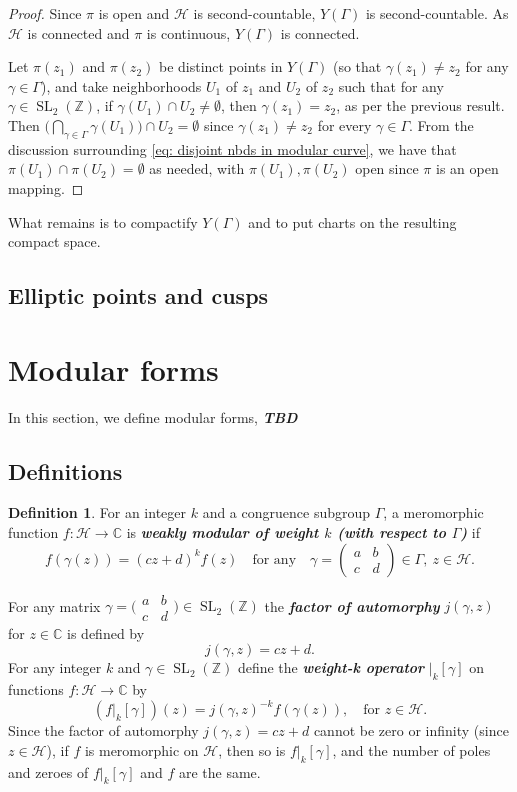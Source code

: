 \documentclass[10pt,leqno]{article}
\theoremstyle{plain}
\theoremstyle{definition}
\newtheorem{definition}[lem]{Definition}
\numberwithin{equation}{section}
\numberwithin{lem}{section}
\newcommand{\textib}[1]{\textbf{\textit{#1}}}
\DeclareMathOperator{\SL}{SL}
\newcommand{\smallabcd}{\big(\!\begin{smallmatrix}
    a & b \\ c & d
\end{smallmatrix}\!\big)}
\newcommand{\abcd}{\begin{pmatrix}
    a & b \\ c & d
\end{pmatrix}}
\newcommand{\slz}{\SL_2(\mathbb{Z})}
\begin{document}
\begin{proof}
    Since $\pi$ is open and $\mathcal H$ is second-countable, $Y(\varGamma)$ is second-countable. As $\mathcal H$ is connected and $\pi$ is continuous, $Y(\varGamma)$ is connected.

    Let $\pi(z_1)$ and $\pi(z_2)$ be distinct points in $Y(\varGamma)$ (so that $\gamma(z_1)\neq z_2$ for any $\gamma\in \varGamma$), and take neighborhoods $U_1$ of $z_1$ and $U_2$ of $z_2$ such that for any $\gamma\in \slz$, if $\gamma(U_1)\cap U_2\neq \emptyset$, then $\gamma(z_1) = z_2$, as per the previous result. Then $\big(\bigcap_{\gamma\in\varGamma}\gamma(U_1)\big)\cap U_2 = \emptyset$ since $\gamma(z_1)\neq z_2$ for every $\gamma\in \varGamma$. From the discussion surrounding \cref{eq: disjoint nbds in modular curve}, we have that $\pi(U_1)\cap\pi(U_2) = \emptyset$ as needed, with $\pi(U_1),\pi(U_2)$ open since $\pi$ is an open mapping.
\end{proof}

What remains is to compactify $Y(\varGamma)$ and to put charts on the resulting compact space.


\subsection{Elliptic points and cusps}

\newpage\section{Modular forms}
In this section, we define modular forms, \textib{TBD}
\subsection{Definitions}
\begin{definition}
    For an integer $k$ and a congruence subgroup $\varGamma$, a meromorphic function $f\colon \mathcal H\to \mathbb{C}$ is \textib{weakly modular of weight $k$ (with respect to $\varGamma$)} if \[f(\gamma(z)) = (cz+d)^kf(z)\quad\text{for any}\quad \gamma = \abcd\in \varGamma, ~z\in \mathcal H.\]
\end{definition}
For any matrix $\gamma=\smallabcd\in \slz$ the \textib{factor of automorphy} $j(\gamma,z)$ for $z\in \mathbb{C}$ is defined by \[j(\gamma,z) = cz+d.\] For any integer $k$ and $\gamma\in \slz$ define the \textib{weight-k operator} $|_k[\gamma]$ on functions $f\colon \mathcal H\to \mathbb{C}$ by \[(f|_k[\gamma])(z) = j(\gamma,z)^{-k}f(\gamma(z)),\quad\text{for } z\in \mathcal H.\]
Since the factor of automorphy $j(\gamma,z) = cz+d$ cannot be zero or infinity (since $z\in \mathcal H$), if $f$ is meromorphic on $\mathcal H$, then so is $f|_k[\gamma]$, and the number of poles and zeroes of $f|_k[\gamma]$ and $f$ are the same.
\end{document}
